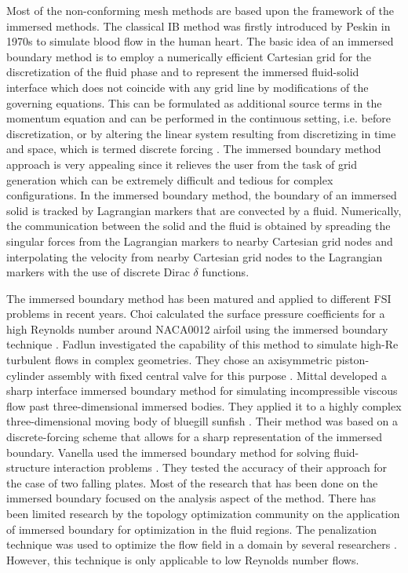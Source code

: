 \documentclass{aiaa-pretty}
\begin{document}
Most of the non-conforming mesh methods are based upon the framework of the immersed methods. The classical IB method was firstly introduced by Peskin in 1970s \cite{peskin1972flow} to simulate blood flow in the human heart. The basic idea of an immersed boundary method is to employ a numerically efficient Cartesian grid for the discretization of the fluid phase and to represent the immersed fluid-solid interface which does not coincide with any grid line by modifications of the governing equations. This can be formulated as additional source terms in the momentum equation and can be performed in the continuous setting, i.e. before discretization, or by altering the linear system resulting from discretizing in time and space, which is termed discrete forcing \cite{mittal2005immersed}. The immersed boundary method approach is very appealing since it relieves the user from the task of grid generation which can be extremely difficult and tedious for complex configurations. In the immersed boundary method, the boundary of an immersed solid is tracked by Lagrangian markers that are convected by a fluid. Numerically, the communication between the solid and the fluid is obtained by spreading the singular forces from the Lagrangian markers to nearby Cartesian grid nodes and interpolating the velocity from nearby Cartesian grid nodes to the Lagrangian markers with the use of discrete Dirac $\delta$ functions.

The immersed boundary method has been matured and applied to different FSI problems in recent years. Choi calculated the surface pressure coefficients for a high Reynolds number around NACA0012 airfoil using the immersed boundary technique \cite{choi2007immersed}. Fadlun investigated the capability of this method to simulate high-Re turbulent flows in complex geometries. They chose an axisymmetric piston-cylinder assembly with fixed central valve for this purpose \cite{fadlun2000combined}. Mittal developed a sharp interface immersed boundary method for simulating incompressible viscous flow past three-dimensional immersed bodies. They applied it to a highly complex three-dimensional moving body of bluegill sunfish \cite{mittal2008versatile}. Their method was based on a discrete-forcing scheme that allows for a sharp representation of the immersed boundary. Vanella used the immersed boundary method for solving fluid-structure interaction problems \cite{vanella2010direct}. They tested the accuracy of their approach for the case of two falling plates. Most of the research that has been done on the immersed boundary focused on the analysis aspect of the method. There has been limited  research by the topology optimization community on the application of immersed boundary for optimization in the fluid regions. The penalization technique was used to optimize the flow field in a domain by several researchers \cite{challis2009level, pingen2010parametric, zhou2008variational, kreissl2012levelset, borrvall2003topology}. However, this technique is only applicable to low Reynolds number flows.
\end{document}
